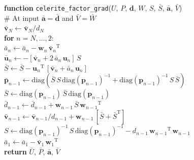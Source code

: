 \documentclass[rnaas]{aastex62}
\newcommand{\T}{\ensuremath{\mathrm{T}}}
\newcommand{\bvec}[1]{{\ensuremath{\boldsymbol{#1}}}}
\begin{document}
\medskip
\begin{minipage}{\linewidth}
\textbf{function} \texttt{celerite\_factor\_grad}($U$, $P$, $\bvec{d}$, $W$,
    $S$, $\bar{S}$, $\bar{\bvec{a}}$, $\bar{V}$) \\
\hspace*{2em}\textsf{\# At input $\bar{\bvec{a}} = \bar{\bvec{d}}$ and
    $\bar{V} = \bar{W}$}\\
    \hspace*{2em}$\bar{\bvec{v}}_N \gets \bar{\bvec{v}}_N / d_N$\\
\hspace*{2em}\textbf{for} $n = N,\ldots,2$:\\
\hspace*{2em}\hspace*{2em}$\bar{a}_n \gets \bar{a}_n -
    \bvec{w}_n\,{\bar{\bvec{v}}_n}^\T$\\
\hspace*{2em}\hspace*{2em}$\bar{\bvec{u}}_n \gets - [\bar{\bvec{v}}_n +
    2\,\bar{a}_n\,\bvec{u}_n]\,S$\\
\hspace*{2em}\hspace*{2em}$\bar{S} \gets \bar{S} -
    {\bvec{u}_n}^\T\,[\bar{\bvec{v}}_n + \bar{a}_n\,\bvec{u}_n]$\\

\hspace*{2em}\hspace*{2em}$\bar{\bvec{p}}_{n-1} \gets \mathrm{diag}(\bar{S}\,S
    \,\mathrm{diag}(\bvec{p}_{n-1})^{-1} + \mathrm{diag}(\bvec{p}_{n-1})^{-1}\,
    S\,\bar{S})$\\
\hspace*{2em}\hspace*{2em}$\bar{S} \gets \mathrm{diag}(\bvec{p}_{n-1})\,
    \bar{S}\,\mathrm{diag}(\bvec{p}_{n-1})$\\
\hspace*{2em}\hspace*{2em}$\bar{d}_{n-1} \gets \bar{d}_{n-1} +
    \bvec{w}_{n-1}\,\bar{S}\,{\bvec{w}_{n-1}}^\T$\\
\hspace*{2em}\hspace*{2em}$\bar{\bvec{v}}_{n-1} \gets \bar{\bvec{v}}_{n-1}
    / d_{n-1} + \bvec{w}_{n-1}\,[\bar{S} + \bar{S}^\T]$\\

\hspace*{2em}\hspace*{2em}$S \gets \mathrm{diag}(\bvec{p}_{n-1})^{-1}\,S\,
    \mathrm{diag}(\bvec{p}_{n-1})^{-1}
    - d_{n-1}\,{\bvec{w}_{n-1}}^\T\,\bvec{w}_{n-1}$\\

\hspace*{2em}$\bar{a}_1 \gets \bar{a}_1 -
    \bar{\bvec{v}}_1\,{\bvec{w}_1}^\T$\\

\hspace*{2em}\textbf{return} $\bar{U}$, $\bar{P}$, $\bar{\bvec{a}}$, $\bar{V}$
\end{minipage}
\medskip
\end{document}
